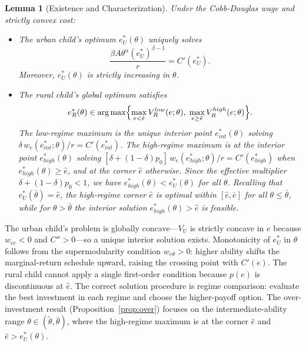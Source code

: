 \documentclass[12pt]{article}
\theoremstyle{plain}
\newtheorem{lemma}{Lemma}
\theoremstyle{definition}
\theoremstyle{remark}
\begin{document}
\begin{lemma}[Existence and Characterization]
\label{lem:exist}
Under the Cobb-Douglas wage and strictly convex cost:
\begin{itemize}
  \item[\textit{(i)}] The urban child's optimum $e^{*}_{U}(\theta)$ uniquely
    solves
    \begin{equation}
      \frac{\beta A\theta^{\alpha}(e^{*}_{U})^{\beta-1}}{r}=C'(e^{*}_{U}).
      \label{eq:focU}
    \end{equation}
    Moreover, $e^{*}_{U}(\theta)$ is strictly increasing in $\theta$.
  \item[\textit{(ii)}] The rural child's global optimum satisfies
    \[
      e^{*}_{R}(\theta)\in
      \arg\max\Bigl\{\max_{e<\hat{e}}V_{R}^{low}(e;\theta),\;
      \max_{e\geq\hat{e}}V_{R}^{high}(e;\theta)\Bigr\}.
    \]
    The low-regime maximum is the unique interior point $e^{*}_{int}(\theta)$
    solving $\delta\,w_{e}(e^{*}_{int};\theta)/r=C'(e^{*}_{int})$.
    The high-regime maximum is at the interior point $e^{*}_{high}(\theta)$
    solving $[\delta+(1-\delta)p_{0}]\,w_{e}(e^{*}_{high};\theta)/r=
    C'(e^{*}_{high})$ when $e^{*}_{high}(\theta)\geq\hat{e}$, and at the corner
    $\hat{e}$ otherwise.  Since the effective multiplier
    $\delta+(1-\delta)p_{0}<1$, we have $e^{*}_{high}(\theta)<e^{*}_{U}(\theta)$
    for all $\theta$.  Recalling that $e^{*}_{U}(\bar{\theta})=\hat{e}$, the
    high-regime corner $\hat{e}$ is optimal within $[\hat{e},\bar{e}]$ for all
    $\theta\leq\bar{\theta}$, while for $\theta>\bar{\theta}$ the interior
    solution $e^{*}_{high}(\theta)>\hat{e}$ is feasible.
\end{itemize}
\end{lemma}

The urban child's problem is globally concave---$V_{U}$ is strictly concave in
$e$ because $w_{ee}<0$ and $C''>0$---so a unique interior solution exists.
Monotonicity of $e^{*}_{U}$ in $\theta$ follows from the supermodularity
condition $w_{e\theta}>0$: higher ability shifts the marginal-return schedule
upward, raising the crossing point with $C'(e)$.  The rural child cannot apply
a single first-order condition because $p(e)$ is discontinuous at $\hat{e}$.
The correct solution procedure is regime comparison: evaluate the best investment
in each regime and choose the higher-payoff option.  The over-investment result
(Proposition~\ref{prop:over}) focuses on the intermediate-ability range
$\theta\in(\tilde{\theta},\bar{\theta})$, where the high-regime maximum is at
the corner $\hat{e}$ and $\hat{e}>e^{*}_{U}(\theta)$.
\end{document}
